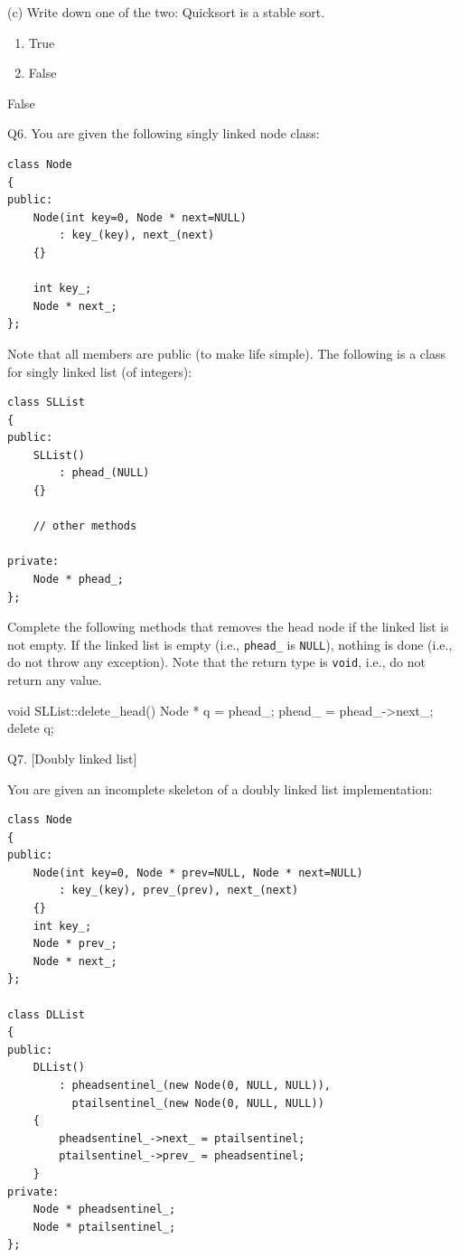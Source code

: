 (c) Write down one of the two: Quicksort is a stable sort.
\begin{enumerate}
  \item[(A)] True
  \item[(B)] False
\end{enumerate}
\ANSWER
\begin{answercode}
False
\end{answercode}


\newpage
Q6.
You are given the following singly linked node class:
\begin{Verbatim}[frame=single,fontsize=\footnotesize]
class Node
{
public:
    Node(int key=0, Node * next=NULL)
        : key_(key), next_(next)
    {}
    
    int key_;
    Node * next_;
};
\end{Verbatim}
Note that all members are public (to make life simple).
The following is a class for singly linked list (of integers):
\begin{Verbatim}[frame=single,fontsize=\footnotesize]
class SLList
{
public:
    SLList()
        : phead_(NULL)
    {}
    
    // other methods
    
private:
    Node * phead_;
};
\end{Verbatim}

Complete the following methods that removes the head node
if the linked list is not empty.
If the linked list is empty (i.e., \verb!phead_! is \verb!NULL!),
nothing is done (i.e., do not throw any exception).
Note that the return type is \verb!void!, i.e., do not
return any value.
\ANSWER
\begin{answercode}
void SLList::delete_head()
{
  Node * q = phead_;
  phead_ = phead_->next_;
  delete q;
}
\end{answercode}




\newpage
Q7. [Doubly linked list]

You are given an incomplete skeleton of a doubly linked list implementation:
\begin{Verbatim}[frame=single,fontsize=\footnotesize]
class Node
{
public:
    Node(int key=0, Node * prev=NULL, Node * next=NULL)
        : key_(key), prev_(prev), next_(next)
    {}
    int key_;
    Node * prev_;
    Node * next_;
};

class DLList
{
public:
    DLList()
        : pheadsentinel_(new Node(0, NULL, NULL)),
          ptailsentinel_(new Node(0, NULL, NULL))
    {
        pheadsentinel_->next_ = ptailsentinel;        
        ptailsentinel_->prev_ = pheadsentinel;        
    }
private:
    Node * pheadsentinel_;  
    Node * ptailsentinel_;  
};
\end{Verbatim}

